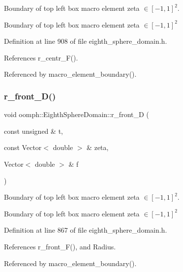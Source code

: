 Boundary of top left box macro element zeta $ \in [-1,1]^2 $. 

Boundary of top left box macro element zeta $ \in [-1,1]^2 $ 

Definition at line 908 of file eighth\+\_\+sphere\+\_\+domain.\+h.



References r\+\_\+centr\+\_\+\+F().



Referenced by macro\+\_\+element\+\_\+boundary().

\mbox{\label{classoomph_1_1EighthSphereDomain_a46ccabe44dd16cae048c302d5cfe26ee}} 
\subsubsection{\texorpdfstring{r\+\_\+front\+\_\+\+D()}{r\_front\_D()}}
{\footnotesize\ttfamily void oomph\+::\+Eighth\+Sphere\+Domain\+::r\+\_\+front\+\_\+D (\begin{DoxyParamCaption}\item[{const unsigned \&}]{t,  }\item[{const Vector$<$ double $>$ \&}]{zeta,  }\item[{Vector$<$ double $>$ \&}]{f }\end{DoxyParamCaption})\hspace{0.3cm}{\ttfamily [private]}}



Boundary of top left box macro element zeta $ \in [-1,1]^2 $. 

Boundary of top left box macro element zeta $ \in [-1,1]^2 $ 

Definition at line 867 of file eighth\+\_\+sphere\+\_\+domain.\+h.



References r\+\_\+front\+\_\+\+F(), and Radius.



Referenced by macro\+\_\+element\+\_\+boundary().

\mbox{\label{classoomph_1_1EighthSphereDomain_a71d48567ee2661821f41dd50793a6eb1}} 
